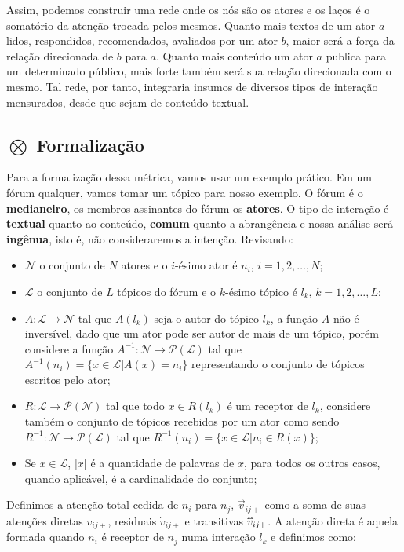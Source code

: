Assim, podemos construir uma rede onde os nós são os atores e os laços é o
somatório da atenção trocada pelos mesmos. Quanto mais textos de um ator $a$
lidos, respondidos, recomendados, avaliados por um ator $b$, maior será a força
da relação direcionada de $b$ para $a$. Quanto mais conteúdo um ator $a$ publica
para um determinado público, mais forte também será sua relação direcionada
com o mesmo. Tal rede, por tanto, integraria insumos de diversos tipos de
interação mensurados, desde que sejam de conteúdo textual.

\subsection{$\bigotimes$ Formalização}
\label{sec:formalizacao}
Para a formalização dessa métrica, vamos usar um exemplo prático. Em um fórum
qualquer, vamos tomar um tópico para nosso exemplo. O fórum é o
\textbf{medianeiro}, os membros assinantes do fórum os \textbf{atores}. O tipo de
interação é \textbf{textual} quanto ao conteúdo, \textbf{comum} quanto a
abrangência e nossa análise será \textbf{ingênua}, isto é, não consideraremos a
intenção. Revisando:
\begin{itemize}
  \item $\mathscr{N}$ o conjunto de $N$ atores e o $i$-ésimo ator é $n_i$,
  $i=1,2,\ldots,N$;
  \item $\mathscr{L}$ o conjunto de $L$ tópicos do fórum e o $k$-ésimo
  tópico é $l_k$, $k=1,2,\ldots,L$;
  \item $A:\mathscr{L}\to \mathscr{N}$ tal que $A(l_k)$ seja o
  autor do tópico $l_k$, a função $A$ não é inversível, dado que um ator pode
  ser autor de mais de um tópico, porém considere a função
  $A^{-1}:\mathscr{N}\to \mathscr{P}(\mathscr{L})$ tal que $A^{-1}(n_i) = \{x
  \in \mathscr{L}|A(x) = n_i\}$ representando o conjunto de tópicos escritos
  pelo ator;
  \item $R:\mathscr{L}\to \mathscr{P}(\mathscr{N})$ tal que todo $x \in R(l_k)$
  é um receptor de $l_k$, considere também o conjunto de tópicos recebidos por
  um ator como sendo $R^{-1}:\mathscr{N}\to \mathscr{P}(\mathscr{L})$ tal que
  $R^{-1}(n_i) = \{x \in \mathscr{L}|n_i\in R(x)\}$;
  \item Se $x \in \mathscr{L}$, $|x|$ é a quantidade de palavras de $x$, para
  todos os outros casos, quando aplicável, é a cardinalidade do conjunto;
\end{itemize}

Definimos a atenção total cedida de $n_i$ para $n_j$, $\vec{v}_{ij+}$
como a soma de suas atenções diretas $v_{ij+}$, residuais $\dot{v}_{ij+}$ e
transitivas $\widetriangle{v}_{ij+}$. A atenção direta é aquela formada quando
$n_i$ é receptor de $n_j$ numa interação $l_k$ e definimos como:

